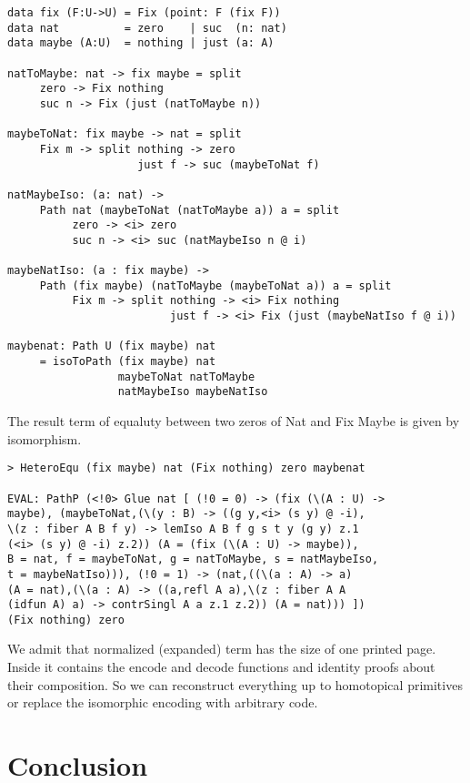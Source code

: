 \documentclass{article}
\begin{document}
\begin{lstlisting}[mathescape=true]
data fix (F:U->U) = Fix (point: F (fix F))
data nat          = zero    | suc  (n: nat)
data maybe (A:U)  = nothing | just (a: A)

natToMaybe: nat -> fix maybe = split
     zero -> Fix nothing
     suc n -> Fix (just (natToMaybe n))

maybeToNat: fix maybe -> nat = split
     Fix m -> split nothing -> zero
                    just f -> suc (maybeToNat f)

natMaybeIso: (a: nat) ->
     Path nat (maybeToNat (natToMaybe a)) a = split
          zero -> <i> zero
          suc n -> <i> suc (natMaybeIso n @ i)

maybeNatIso: (a : fix maybe) ->
     Path (fix maybe) (natToMaybe (maybeToNat a)) a = split
          Fix m -> split nothing -> <i> Fix nothing
                         just f -> <i> Fix (just (maybeNatIso f @ i))

maybenat: Path U (fix maybe) nat
     = isoToPath (fix maybe) nat
                 maybeToNat natToMaybe
                 natMaybeIso maybeNatIso
\end{lstlisting}

The result term of equaluty between two zeros of Nat and Fix Maybe is given by isomorphism.

\begin{lstlisting}[mathescape=true]
> HeteroEqu (fix maybe) nat (Fix nothing) zero maybenat

EVAL: PathP (<!0> Glue nat [ (!0 = 0) -> (fix (\(A : U) ->
maybe), (maybeToNat,(\(y : B) -> ((g y,<i> (s y) @ -i),
\(z : fiber A B f y) -> lemIso A B f g s t y (g y) z.1
(<i> (s y) @ -i) z.2)) (A = (fix (\(A : U) -> maybe)),
B = nat, f = maybeToNat, g = natToMaybe, s = natMaybeIso,
t = maybeNatIso))), (!0 = 1) -> (nat,((\(a : A) -> a)
(A = nat),(\(a : A) -> ((a,refl A a),\(z : fiber A A
(idfun A) a) -> contrSingl A a z.1 z.2)) (A = nat))) ])
(Fix nothing) zero
\end{lstlisting}

We admit that normalized (expanded) term has the size of one printed page.
Inside it contains the encode and decode functions and identity proofs
about their composition. So we can reconstruct everything up to homotopical
primitives or replace the isomorphic encoding with arbitrary code.

\section{Conclusion}
\end{document}
